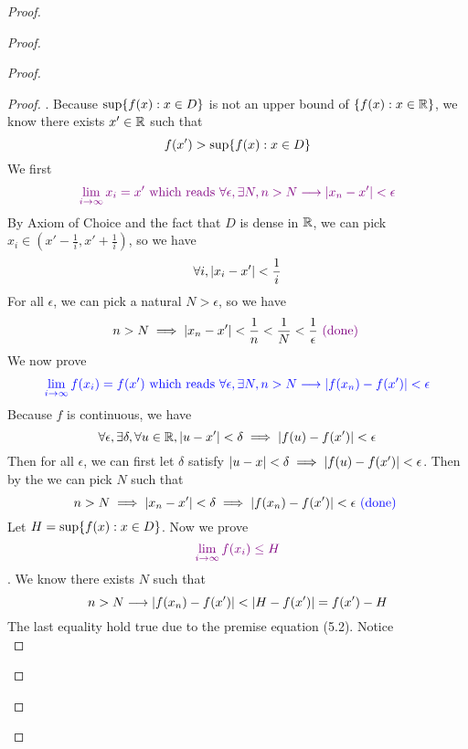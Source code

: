 \documentclass{report}
\begin{document}
\begin{proof}
\begin{proof}
\begin{proof}
\begin{proof}
. Because $\sup \{ f(x):x\in D \}$ is not an upper bound of $\{ f(x):x\in \mathbb{R} \}$, we know there exists $x'\in \mathbb{R}$ such that 
\begin{equation}
f(x')>\sup \{ f(x):x\in D \}
\end{equation}
We first  
\begin{equation}
  \textcolor{violet}{\lim_{i\to \infty}x_i=x'\text{ which reads } \forall \epsilon, \exists N, n>N \longrightarrow |x_n - x'|<\epsilon}
\end{equation}
By Axiom of Choice and the fact that $D$ is dense in  $\mathbb{R}$, we can pick $x_i \in (x'- \frac{1}{i},x' +\frac{1}{i})$, so we have
\begin{equation}
\forall i, |x_i-x'|<\frac{1}{i}
\end{equation}
For all $\epsilon $, we can pick a natural $N>\epsilon $, so we have 
\begin{equation}
n>N\implies |x_n-x'|<\frac{1}{n}<\frac{1}{N}<\frac{1}{\epsilon }\textcolor{violet}{\text{ (done) }}
\end{equation}
We now prove 
\begin{equation}
\textcolor{blue}{\lim_{i\to\infty}f(x_i)=f(x')\text{ which reads }\forall \epsilon , \exists N, n>N\longrightarrow  |f(x_n)-f(x')|<\epsilon }
\end{equation}
Because $f$ is continuous, we have 
\begin{equation}
  \forall \epsilon ,\exists \delta, \forall u\in \mathbb{R}, |u-x'|<\delta\implies |f(u)-f(x')|<\epsilon  
\end{equation}
Then for all $\epsilon $, we can first let $\delta$ satisfy $|u-x|<\delta \implies |f(u)-f(x')|<\epsilon $. Then by the  we can pick $N$ such that 
\begin{equation}
n>N\implies |x_n - x'|< \delta \implies |f(x_n)-f(x')|<\epsilon \textcolor{blue}{\text{ (done) }} 
\end{equation}
Let $H=\sup \{ f(x): x\in D \}$. Now we prove  
\begin{equation}
  \textcolor{violet}{\lim_{i \to \infty}f(x_i)\leq H}
\end{equation}
. We know there exists $N$ such that 
\begin{equation}
n>N\longrightarrow \abso{f(x_n)-f(x')}<\abso{H - f(x') }=f(x')-H
\end{equation}
The last equality hold true due to the premise equation (5.2). Notice 
\begin{equation}

\end{equation}
\end{proof}
\end{proof}
\end{proof}
\end{proof}
\end{document}
